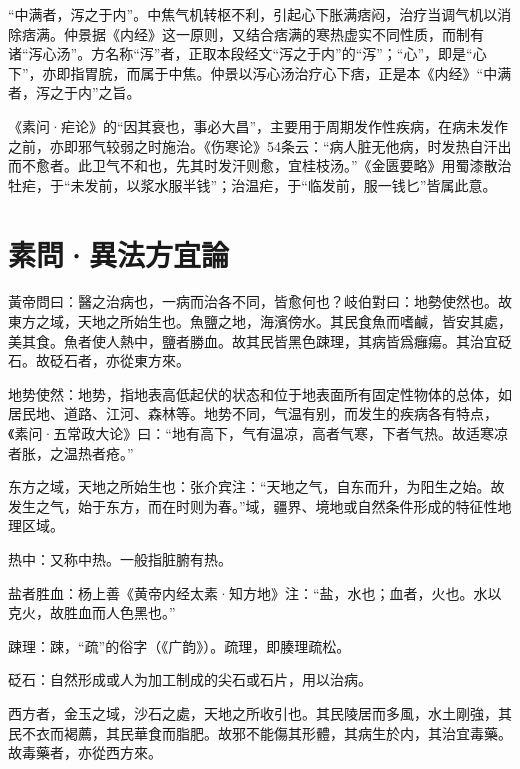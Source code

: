 \documentclass[draft,12pt]{ctexbook}
\begin{document}
“中满者，泻之于内”。中焦气机转枢不利，引起心下胀满痞闷，治疗当调气机以消除痞满。仲景据《内经》这一原则，又结合痞满的寒热虚实不同性质，而制有诸“泻心汤”。方名称“泻”者，正取本段经文“泻之于内”的“泻”；“心”，即是“心下”，亦即指胃脘，而属于中焦。仲景以泻心汤治疗心下痞，正是本《内经》“中满者，泻之于内”之旨。

《素问·疟论》的“因其衰也，事必大昌”，主要用于周期发作性疾病，在病未发作之前，亦即邪气较弱之时施治。《伤寒论》54条云：“病人脏无他病，时发热自汗出而不愈者。此卫气不和也，先其时发汗则愈，宜桂枝汤。”《金匮要略》用蜀漆散治牡疟，于“未发前，以浆水服半钱”；治温疟，于“临发前，服一钱匕”皆属此意。

\section{素問·異法方宜論}%


\begin{yuanwen}
黃帝問曰：醫之治病也，一病而治各不同，皆愈何也？岐伯對曰：地勢使然也。故東方之域，天地之所始生也。魚鹽之地，海濱傍水。其民食魚而嗜鹹，皆安其處，美其食。魚者使人熱中，鹽者勝血。故其民皆黑色踈理，其病皆爲癰瘍。其治宜砭石。故砭石者，亦從東方來。
\end{yuanwen}


\begin{jiaozhu}
  \item 地势使然：地势，指地表高低起伏的状态和位于地表面所有固定性物体的总体，如居民地、道路、江河、森林等。地势不同，气温有别，而发生的疾病各有特点，《素问·五常政大论》曰：“地有高下，气有温凉，高者气寒，下者气热。故适寒凉者胀，之温热者疮。”
  \item 东方之域，天地之所始生也：张介宾注：“天地之气，自东而升，为阳生之始。故发生之气，始于东方，而在时则为春。”域，疆界、境地或自然条件形成的特征性地理区域。
  \item 热中：又称中热。一般指脏腑有热。
  \item 盐者胜血：杨上善《黄帝内经太素·知方地》注：“盐，水也；血者，火也。水以克火，故胜血而人色黑也。”
  \item 踈理：踈，“疏”的俗字（《广韵》）。疏理，即腠理疏松。
  \item 砭石：自然形成或人为加工制成的尖石或石片，用以治病。
\end{jiaozhu}


\begin{yuanwen}
西方者，金玉之域，沙石之處，天地之所收引也。其民陵居而多風，水土剛強，其民不衣而褐薦，其民華食而脂肥。故邪不能傷其形體，其病生於内，其治宜毒藥。故毒藥者，亦從西方來。
\end{yuanwen}
\end{document}
